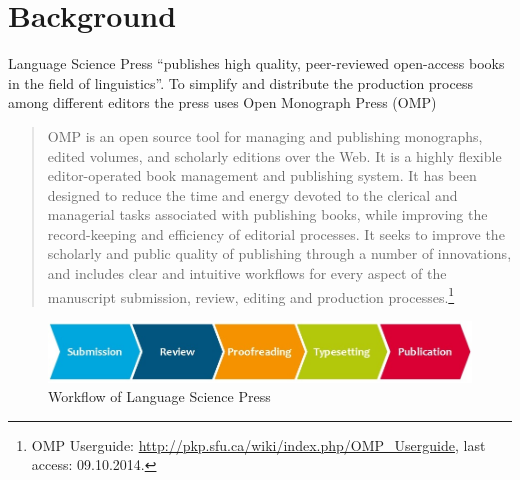 




 
\chapter{Background} \label{sec:intro}

Language Science Press%
``publishes high quality, peer-reviewed open-access books in the field of linguistics''. To simplify and distribute the production process among different editors the press uses Open Monograph Press (OMP) %

\begin{quote}
OMP is an open source tool for managing and publishing monographs, edited volumes, and scholarly editions over the Web. It is a highly flexible editor-operated book management and publishing system. It has been designed to reduce the time and energy devoted to the clerical and managerial tasks associated with publishing books, while improving the record-keeping and efficiency of editorial processes. It seeks to improve the scholarly and public quality of publishing through a number of innovations, and includes clear and intuitive workflows for every aspect of the manuscript submission, review, editing and production processes.\footnote{OMP Userguide: \url{http://pkp.sfu.ca/wiki/index.php/OMP_Userguide}, last access: 09.10.2014.}
\end{quote}

\begin{figure}[h] \centering
\includegraphics[width=\textwidth]{./img/workflow.jpg}
\caption{Workflow of Language Science Press}
\label{fig:workflow}
\end{figure}

